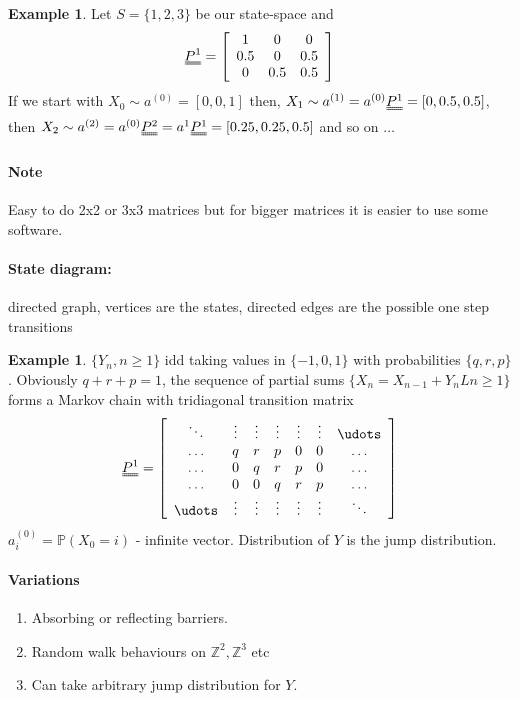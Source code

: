 \documentclass{article}
\theoremstyle{definition}
\newtheorem{ex}[thm]{Example}
\begin{document}
\begin{ex} Let $S = \{1, 2, 3\}$ be our state-space and
\[
\uuline{P^{1}} =  \left [ \begin{array}{ccc}
1 & 0 & 0\\ 0.5 & 0 & 0.5\\ 0 & 0.5 & 0.5 \end{array} \right ]
\]
If we start with $X_0 \sim a^{(0)} = [ 0,0,1 ]$ then, $X_1 \sim a^{(1)} = a^{(0)} \uuline{P^{1}} = [0,0.5,0.5]$, then $X_2 \sim a^{(2)} = a^{(0)} \uuline{P^{2}} = a^{1}\uuline{P^1} = [ 0.25, 0.25, 0.5 ]$ and so on $\ldots$
\end{ex}

\paragraph*{Note} Easy to do 2x2 or 3x3 matrices but for bigger matrices it is easier to use some software.

\paragraph*{State diagram:} directed graph, vertices are the states, directed edges are the possible one step transitions

\begin{ex} $\{Y_n, n \geq 1 \}$ idd taking values in $\{-1, 0, 1\}$ with probabilities $\{q, r, p\}$. Obviously $q + r + p = 1$, the sequence of partial sums $\{X_n = X_{n-1} + Y_n L n \geq 1\}$ forms a Markov chain with tridiagonal transition matrix
\[
\uuline{P^1} = \left [ \begin{array}{ccccccc}
\ddots & \vdots & \vdots & \vdots & \vdots & \vdots & \udots\\
\hdots & q & r & p & 0 & 0 & \hdots\\
\hdots & 0 & q & r & p & 0 & \hdots\\
\hdots & 0 & 0 & q & r & p & \hdots\\
\udots & \vdots & \vdots & \vdots & \vdots & \vdots & \ddots\\
\end{array} \right ]
\]
$a_i^{(0)} = \mathbb{P}(X_0 = i)$ - infinite vector. Distribution of $Y$ is the jump distribution.
\end{ex}

\paragraph*{Variations}
\begin{enumerate}
\item
Absorbing or reflecting barriers.
\item
Random walk behaviours on $\mathbb{Z}^2, \mathbb{Z}^3$ etc
\item
Can take arbitrary jump distribution for $Y$.
\end{enumerate}
\end{document}
